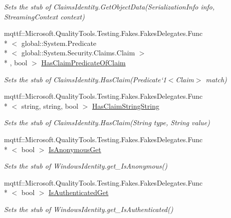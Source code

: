 \begin{DoxyCompactItemize}
\begin{DoxyCompactList}\small\item\em Sets the stub of Claims\-Identity.\-Get\-Object\-Data(\-Serialization\-Info info, Streaming\-Context context)\end{DoxyCompactList}\item 
mqttf\-::\-Microsoft.\-Quality\-Tools.\-Testing.\-Fakes.\-Fakes\-Delegates.\-Func\\*
$<$ global\-::\-System.\-Predicate\\*
$<$ global\-::\-System.\-Security.\-Claims.\-Claim $>$\\*
, bool $>$ \hyperlink{class_system_1_1_security_1_1_principal_1_1_fakes_1_1_stub_windows_identity_a3605e3642c9837937c79bf3673541276}{Has\-Claim\-Predicate\-Of\-Claim}
\begin{DoxyCompactList}\small\item\em Sets the stub of Claims\-Identity.\-Has\-Claim(Predicate`1$<$Claim$>$ match)\end{DoxyCompactList}\item 
mqttf\-::\-Microsoft.\-Quality\-Tools.\-Testing.\-Fakes.\-Fakes\-Delegates.\-Func\\*
$<$ string, string, bool $>$ \hyperlink{class_system_1_1_security_1_1_principal_1_1_fakes_1_1_stub_windows_identity_a35ce7f9619782346d4bc3381b56c0764}{Has\-Claim\-String\-String}
\begin{DoxyCompactList}\small\item\em Sets the stub of Claims\-Identity.\-Has\-Claim(\-String type, String value)\end{DoxyCompactList}\item 
mqttf\-::\-Microsoft.\-Quality\-Tools.\-Testing.\-Fakes.\-Fakes\-Delegates.\-Func\\*
$<$ bool $>$ \hyperlink{class_system_1_1_security_1_1_principal_1_1_fakes_1_1_stub_windows_identity_a60c938ed7ccc7c8787907aeb5dc8be3a}{Is\-Anonymous\-Get}
\begin{DoxyCompactList}\small\item\em Sets the stub of Windows\-Identity.\-get\-\_\-\-Is\-Anonymous()\end{DoxyCompactList}\item 
mqttf\-::\-Microsoft.\-Quality\-Tools.\-Testing.\-Fakes.\-Fakes\-Delegates.\-Func\\*
$<$ bool $>$ \hyperlink{class_system_1_1_security_1_1_principal_1_1_fakes_1_1_stub_windows_identity_a39d59e4039b9aeb84c8b0fd9905b03c7}{Is\-Authenticated\-Get}
\begin{DoxyCompactList}\small\item\em Sets the stub of Windows\-Identity.\-get\-\_\-\-Is\-Authenticated()\end{DoxyCompactList}\item 

\end{DoxyCompactItemize}
